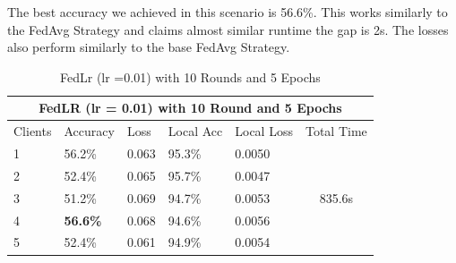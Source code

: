 \documentclass[conference]{IEEEtran}
\begin{document}
 The best accuracy we achieved in this scenario is 56.6\%. This works similarly to the FedAvg Strategy and claims almost similar runtime the gap is 2s. The losses also perform similarly to the base FedAvg Strategy. 
 \begin{table}[ht]
 	\centering
 	\caption{FedLr (lr =0.01) with 10 Rounds and 5 Epochs}
 		\begin{tabular}{|lllllc|}
 			\hline
 			\multicolumn{6}{|c|}{FedLR (lr = 0.01) with 10 Round and 5 Epochs}                                                                                                                                     \\ \hline
 			\multicolumn{1}{|l|}{Clients} & \multicolumn{1}{l|}{Accuracy}        & \multicolumn{1}{l|}{Loss}  & \multicolumn{1}{l|}{Local Acc} & \multicolumn{1}{l|}{Local Loss} & \multicolumn{1}{l|}{Total Time} \\ \hline
 			\multicolumn{1}{|l|}{1}       & \multicolumn{1}{l|}{56.2\%}          & \multicolumn{1}{l|}{0.063} & \multicolumn{1}{l|}{95.3\%}    & \multicolumn{1}{l|}{0.0050}     & \multirow{5}{*}{835.6s}         \\ \cline{1-5}
 			\multicolumn{1}{|l|}{2}       & \multicolumn{1}{l|}{52.4\%}          & \multicolumn{1}{l|}{0.065} & \multicolumn{1}{l|}{95.7\%}    & \multicolumn{1}{l|}{0.0047}     &                                 \\ \cline{1-5}
 			\multicolumn{1}{|l|}{3}       & \multicolumn{1}{l|}{51.2\%}          & \multicolumn{1}{l|}{0.069} & \multicolumn{1}{l|}{94.7\%}    & \multicolumn{1}{l|}{0.0053}     &                                 \\ \cline{1-5}
 			\multicolumn{1}{|l|}{4}       & \multicolumn{1}{l|}{\textbf{56.6\%}} & \multicolumn{1}{l|}{0.068} & \multicolumn{1}{l|}{94.6\%}    & \multicolumn{1}{l|}{0.0056}     &                                 \\ \cline{1-5}
 			\multicolumn{1}{|l|}{5}       & \multicolumn{1}{l|}{52.4\%}          & \multicolumn{1}{l|}{0.061} & \multicolumn{1}{l|}{94.9\%}    & \multicolumn{1}{l|}{0.0054}     &                                 \\ \hline
 		\end{tabular}%
 \end{table}   
 
\end{document}
